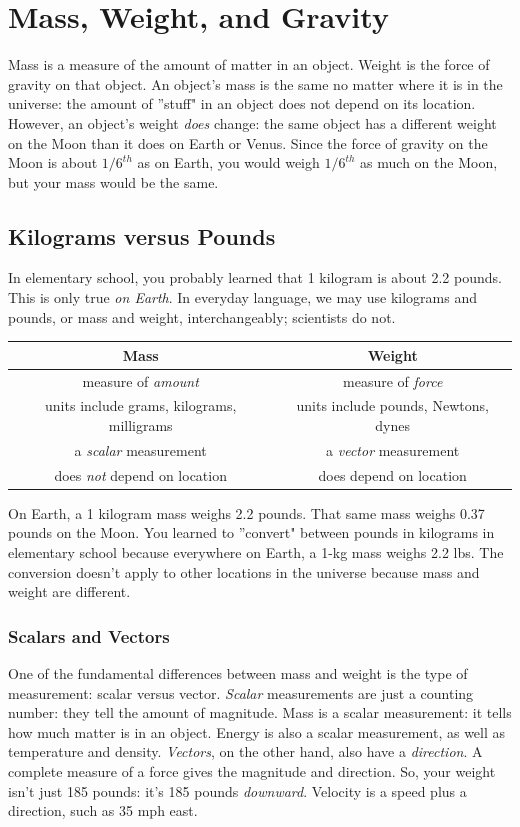 \chapter{Mass, Weight, and Gravity}
Mass is a measure of the amount of matter in an object. Weight is the force of gravity on that object. An object's mass is the same no matter where it is in the universe: the amount of ''stuff" in an object does not depend on its location. However, an object's weight \textit{does} change: the same object has a different weight on the Moon than it does on Earth or Venus. Since the force of gravity on the Moon is about $1/6^{th}$ as on Earth, you would weigh $1/6^{th}$ as much on the Moon, but your mass would be the same. 

\section{Kilograms versus Pounds}
In elementary school, you probably learned that 1 kilogram is about 2.2 pounds. This is only true \textit{on Earth}. In everyday language, we may use kilograms and pounds, or mass and weight, interchangeably; scientists do not. 

\begin{tabular}{|c|c|}\hline
\textbf{Mass} & \textbf{Weight}\\\hline
measure of \textit{amount} & measure of \textit{force}\\\hline
units include grams, kilograms, milligrams & units include pounds, Newtons, dynes\\\hline
a \textit{scalar} measurement & a \textit{vector} measurement\\\hline
does \textit{not} depend on location & does depend on location\\\hline
\end{tabular}

On Earth, a 1 kilogram mass weighs 2.2 pounds. That same mass weighs 0.37 pounds on the Moon. You learned to ''convert" between pounds in kilograms in elementary school because everywhere on Earth, a 1-kg mass weighs 2.2 lbs. The conversion doesn't apply to other locations in the universe because mass and weight are different. 

\subsection{Scalars and Vectors}
One of the fundamental differences between mass and weight is the type of measurement: scalar versus vector. \textit{Scalar} measurements are just a counting number: they tell the amount of magnitude. Mass is a scalar measurement: it tells how much matter is in an object. Energy is also a scalar measurement, as well as temperature and density. \textit{Vectors}, on the other hand, also have a \textit{direction}. A complete measure of a force gives the magnitude and direction. So, your weight isn't just 185 pounds: it's 185 pounds \textit{downward}. Velocity is a speed plus a direction, such as 35 mph east. 


